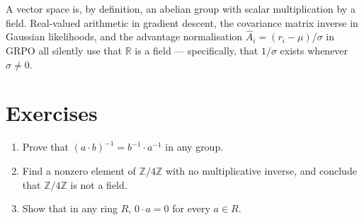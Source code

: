 \documentclass[11pt]{article}
\theoremstyle{definition}
\begin{document}
A vector space is, by definition, an abelian group with scalar multiplication
by a field. Real-valued arithmetic in gradient descent, the covariance matrix
inverse in Gaussian likelihoods, and the advantage normalisation
$\hat{A}_i = (r_i - \mu)/\sigma$ in GRPO all silently use that $\mathbb{R}$ is
a field --- specifically, that $1/\sigma$ exists whenever $\sigma \neq 0$.

\section*{Exercises}
\begin{enumerate}
  \item Prove that $(a \cdot b)^{-1} = b^{-1} \cdot a^{-1}$ in any group.
  \item Find a nonzero element of $\mathbb{Z}/4\mathbb{Z}$ with no
        multiplicative inverse, and conclude that $\mathbb{Z}/4\mathbb{Z}$
        is not a field.
  \item Show that in any ring $R$, $0 \cdot a = 0$ for every $a \in R$.
\end{enumerate}
\end{document}
